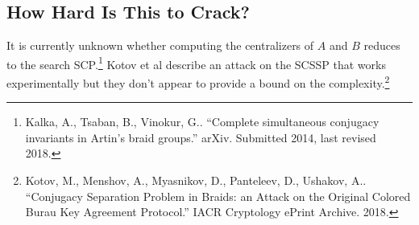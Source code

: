 \documentclass[11pt]{article}
\begin{document}
\subsection*{How Hard Is This to Crack?}
It is currently unknown whether computing the centralizers of $A$ and $B$ reduces to the search SCP.\footnote{Kalka, A., Tsaban, B., Vinokur, G.. ``Complete simultaneous conjugacy invariants in Artin's braid groups.'' arXiv. Submitted 2014, last revised 2018.} Kotov et al describe an attack on the SCSSP that works experimentally but they don't appear to provide a bound on the complexity.\footnote{Kotov, M., Menshov, A., Myasnikov, D., Panteleev, D., Ushakov, A.. ``Conjugacy Separation Problem in Braids: an Attack on the Original Colored Burau Key Agreement Protocol.'' IACR Cryptology ePrint Archive. 2018.}
\end{document}
